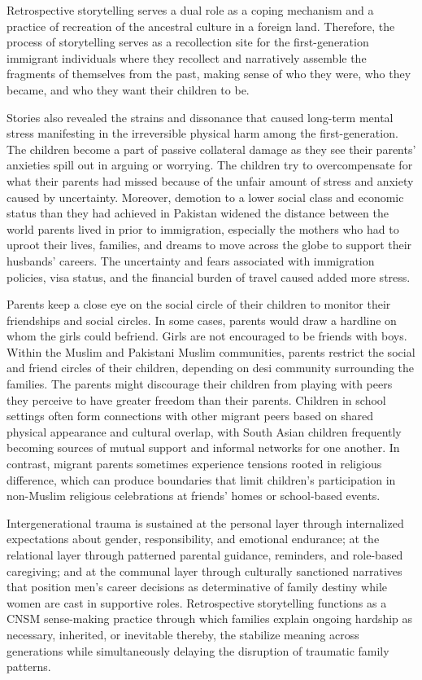 Retrospective storytelling serves a dual role as a coping mechanism and a practice of recreation of the ancestral culture in a foreign land. Therefore, the process of storytelling serves as a recollection site for the first-generation immigrant individuals where they recollect and narratively assemble the fragments of themselves from the past, making sense of who they were, who they became, and who they want their children to be.

Stories also revealed the strains and dissonance that caused long-term mental stress manifesting in the irreversible physical harm among the first-generation. The children become a part of passive collateral damage as they see their parents' anxieties spill out in arguing or worrying. The children try to overcompensate for what their parents had missed because of the unfair amount of stress and anxiety caused by uncertainty. Moreover, demotion to a lower social class and economic status than they had achieved in Pakistan widened the distance between the world parents lived in prior to immigration, especially the mothers who had to uproot their lives, families, and dreams to move across the globe to support their husbands’ careers. The uncertainty and fears associated with immigration policies, visa status, and the financial burden of travel caused added more stress. 

Parents keep a close eye on the social circle of their children to monitor their friendships and social circles. In some cases, parents would draw a hardline on whom the girls could befriend. Girls are not encouraged to be friends with boys. Within the Muslim and Pakistani Muslim communities, parents restrict the social and friend circles of their children, depending on desi community surrounding the families. The parents might discourage their children from playing with peers they perceive to have greater freedom than their parents. Children in school settings often form connections with other migrant peers based on shared physical appearance and cultural overlap, with South Asian children frequently becoming sources of mutual support and informal networks for one another. In contrast, migrant parents sometimes experience tensions rooted in religious difference, which can produce boundaries that limit children’s participation in non-Muslim religious celebrations at friends’ homes or school-based events.

Intergenerational trauma is sustained at the personal layer through internalized expectations about gender, responsibility, and emotional endurance; at the relational layer through patterned parental guidance, reminders, and role-based caregiving; and at the communal layer through culturally sanctioned narratives that position men’s career decisions as determinative of family destiny while women are cast in supportive roles. Retrospective storytelling functions as a CNSM sense-making practice through which families explain ongoing hardship as necessary, inherited, or inevitable thereby, the stabilize meaning across generations while simultaneously delaying the disruption of traumatic family patterns.

